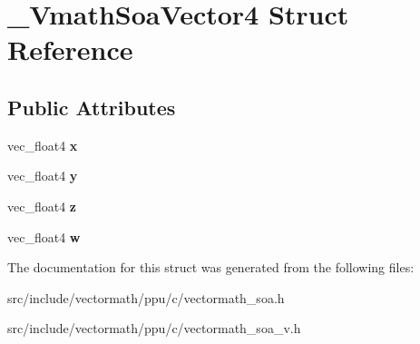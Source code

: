 \hypertarget{struct__VmathSoaVector4}{\section{\-\_\-\-Vmath\-Soa\-Vector4 Struct Reference}
\label{struct__VmathSoaVector4}
}
\subsection*{Public Attributes}
\begin{DoxyCompactItemize}
\item 
\hypertarget{struct__VmathSoaVector4_a9bbac8abd589c01962f89e317f8747fd}{vec\-\_\-float4 {\bfseries x}}\label{struct__VmathSoaVector4_a9bbac8abd589c01962f89e317f8747fd}

\item 
\hypertarget{struct__VmathSoaVector4_a3e08936ccd6f8d727d86be0babf50728}{vec\-\_\-float4 {\bfseries y}}\label{struct__VmathSoaVector4_a3e08936ccd6f8d727d86be0babf50728}

\item 
\hypertarget{struct__VmathSoaVector4_aacf26bee5506ee27362045d93579141e}{vec\-\_\-float4 {\bfseries z}}\label{struct__VmathSoaVector4_aacf26bee5506ee27362045d93579141e}

\item 
\hypertarget{struct__VmathSoaVector4_a9947201bbbd560b6e8422432fcfe9f25}{vec\-\_\-float4 {\bfseries w}}\label{struct__VmathSoaVector4_a9947201bbbd560b6e8422432fcfe9f25}

\end{DoxyCompactItemize}


The documentation for this struct was generated from the following files\-:\begin{DoxyCompactItemize}
\item 
src/include/vectormath/ppu/c/vectormath\-\_\-soa.\-h\item 
src/include/vectormath/ppu/c/vectormath\-\_\-soa\-\_\-v.\-h\end{DoxyCompactItemize}
